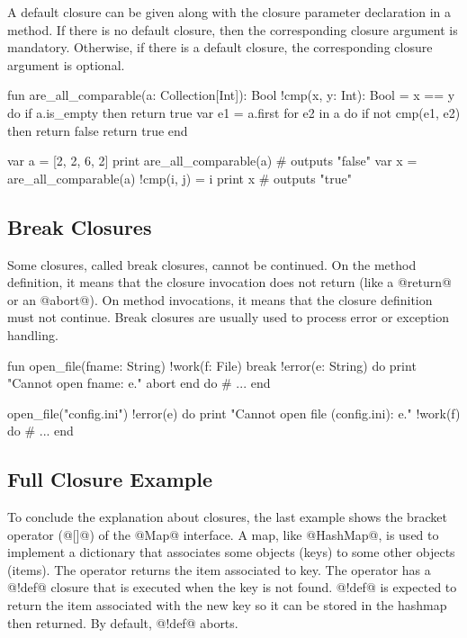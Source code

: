 A default closure can be given along with the closure parameter declaration in a method.
If there is no default closure, then the corresponding closure argument is mandatory.
Otherwise, if there is a default closure, the corresponding closure argument is optional.


\begin{lst}
fun are_all_comparable(a: Collection[Int]): Bool
	!cmp(x, y: Int): Bool = x == y
do
	if a.is_empty then return true
	var e1 = a.first
	for e2 in a do if not cmp(e1, e2) then return false
	return true
end

var a = [2, 2, 6, 2]
print are_all_comparable(a) # outputs "false"
var x = are_all_comparable(a) !cmp(i, j) = i%
print x # outputs "true"
\end{lst}

\subsection{Break Closures}\label{break closure}

Some closures, called break closures, cannot be continued.
On the method definition, it means that the closure invocation does not return (like a @return@ or an @abort@).
On method invocations, it means that the closure definition must not continue.
Break closures are usually used to process error or exception handling.


\begin{lst}
fun open_file(fname: String)
	!work(f: File)
	break !error(e: String) do
		print "Cannot open {fname}: {e}."
		abort
	end
do
	# ...
end

open_file("config.ini") !error(e) do
	print "Cannot open file (config.ini): {e}."
!work(f) do
	# ...
end
\end{lst}

\subsection{Full Closure Example}

To conclude the explanation about closures, the last example shows the bracket operator (@[]@) of the @Map@ interface.
A map, like @HashMap@, is used to implement a dictionary that associates some objects (keys) to some other objects (items).
The operator returns the item associated to key.
The operator has a @!def@ closure that is executed when the key is not found.
@!def@ is expected to return the item associated with the new key so it can be stored in the hashmap then returned.
By default, @!def@ aborts.


